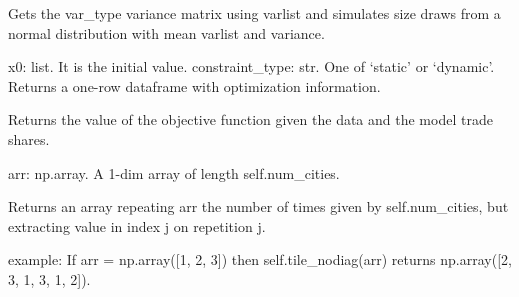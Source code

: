 \documentclass[letterpaper,10pt,english]{sphinxmanual}
\begin{document}
\begin{fulllineitems}
\begin{fulllineitems}
Gets the var\_type variance matrix using varlist and simulates size
draws from a normal distribution with mean varlist and variance.

\end{fulllineitems}


\begin{fulllineitems}
\label{\detokenize{index:estimate.Estimate.solve}}
x0: list. It is the initial value.
constraint\_type: str. One of ‘static’ or ‘dynamic’.
Returns a one-row dataframe with optimization information.

\end{fulllineitems}


\begin{fulllineitems}
\label{\detokenize{index:estimate.Estimate.sqerr_sum}}
Returns the value of the objective function given the data and the
model trade shares.

\end{fulllineitems}


\begin{fulllineitems}
\label{\detokenize{index:estimate.Estimate.tile_nodiag}}
arr: np.array. A 1-dim array of length self.num\_cities.

Returns an array repeating arr the number of times given by
self.num\_cities, but extracting value in index j on repetition j.

example: If arr = np.array({[}1, 2, 3{]}) then self.tile\_nodiag(arr) returns
np.array({[}2, 3, 1, 3, 1, 2{]}).

\end{fulllineitems}


\end{fulllineitems}




\renewcommand{\indexname}{Index}
\printindex
\end{document}
